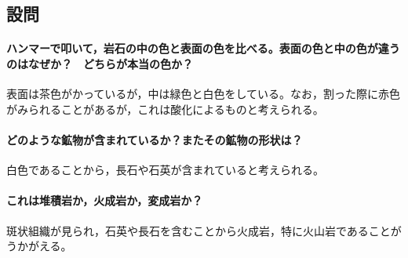 \documentclass[uplatex,b5paper]{jsreport}
\begin{document}
    \subsection{設問}
      \paragraph{ハンマーで叩いて，岩石の中の色と表面の色を比べる。表面の色と中の色が違うのはなぜか？　どちらが本当の色か？}
      表面は茶色がかっているが，中は緑色と白色をしている。なお，割った際に赤色がみられることがあるが，これは酸化によるものと考えられる。
      \paragraph{どのような鉱物が含まれているか？またその鉱物の形状は？}
      白色であることから，長石や石英が含まれていると考えられる。
      \paragraph{これは堆積岩か，火成岩か，変成岩か？}
      斑状組織が見られ，石英や長石を含むことから火成岩，特に火山岩であることがうかがえる。
\end{document}
